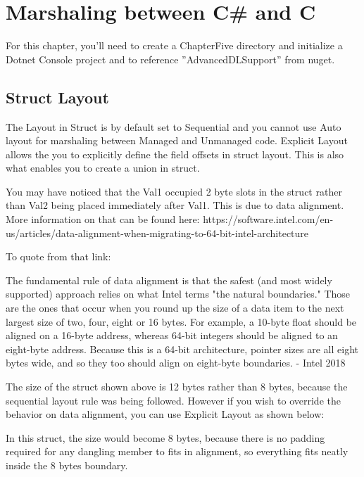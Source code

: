 \chapter{Marshaling between C\# and C}
For this chapter, you'll need to create a ChapterFive directory and initialize a Dotnet Console project and to reference ''AdvancedDLSupport'' from nuget.

\section{Struct Layout}
The Layout in Struct is by default set to Sequential and you cannot use Auto layout for marshaling between Managed and Unmanaged code. Explicit Layout allows the you to explicitly define the field offsets in struct layout. This is also what enables you to  create a union in struct.



You may have noticed that the Val1 occupied 2 byte slots in the struct rather than Val2 being placed immediately after Val1. This is due to data alignment.  More information on that can be found here: https://software.intel.com/en-us/articles/data-alignment-when-migrating-to-64-bit-intel-architecture

To quote from that link:

\begin{coloredbox}
	The fundamental rule of data alignment is that the safest (and most widely supported) approach relies on what Intel terms "the natural boundaries." Those are the ones that occur when you round up the size of a data item to the next largest size of two, four, eight or 16 bytes. For example, a 10-byte float should be aligned on a 16-byte address, whereas 64-bit integers should be aligned to an eight-byte address. Because this is a 64-bit architecture, pointer sizes are all eight bytes wide, and so they too should align on eight-byte boundaries. - Intel 2018
\end{coloredbox}

The size of the struct shown above is 12 bytes rather than 8 bytes, because the sequential layout rule was being followed. However if you wish to override the behavior on data alignment, you can use Explicit Layout as shown below:
\newpage


In this struct, the size would become 8 bytes, because there is no padding required for any dangling member to fits in alignment, so everything fits neatly inside the 8 bytes boundary.

